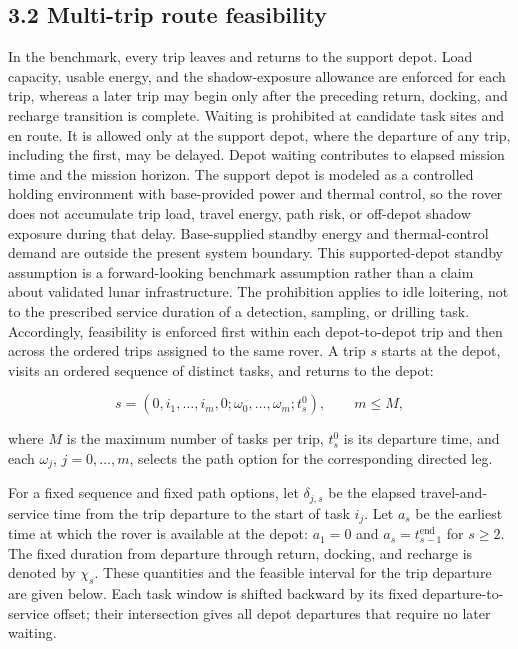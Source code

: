 \documentclass[
  11pt,
]{article}
\begin{document}
\hypertarget{multi-trip-route-feasibility}{%
\subsection{3.2 Multi-trip route
feasibility}\label{multi-trip-route-feasibility}}

In the benchmark, every trip leaves and returns to the support depot.
Load capacity, usable energy, and the shadow-exposure allowance are
enforced for each trip, whereas a later trip may begin only after the
preceding return, docking, and recharge transition is complete. Waiting
is prohibited at candidate task sites and en route. It is allowed only
at the support depot, where the departure of any trip, including the
first, may be delayed. Depot waiting contributes to elapsed mission time
and the mission horizon. The support depot is modeled as a controlled
holding environment with base-provided power and thermal control, so the
rover does not accumulate trip load, travel energy, path risk, or
off-depot shadow exposure during that delay. Base-supplied standby
energy and thermal-control demand are outside the present system
boundary. This supported-depot standby assumption is a forward-looking
benchmark assumption rather than a claim about validated lunar
infrastructure. The prohibition applies to idle loitering, not to the
prescribed service duration of a detection, sampling, or drilling task.
Accordingly, feasibility is enforced first within each depot-to-depot
trip and then across the ordered trips assigned to the same rover. A
trip \(s\) starts at the depot, visits an ordered sequence of distinct
tasks, and returns to the depot:

\[
s=(0,i_1,\ldots,i_m,0; \omega_0,\ldots,\omega_m;t_s^0),
\qquad m\le M,
\tag{2}
\]

where \(M\) is the maximum number of tasks per trip, \(t_s^0\) is its
departure time, and each \(\omega_j\), \(j=0,\ldots,m\), selects the
path option for the corresponding directed leg.

For a fixed sequence and fixed path options, let \(\delta_{j,s}\) be the
elapsed travel-and-service time from the trip departure to the start of
task \(i_j\). Let \(a_s\) be the earliest time at which the rover is
available at the depot: \(a_1=0\) and \(a_s=t_{s-1}^{\mathrm{end}}\) for
\(s\ge2\). The fixed duration from departure through return, docking,
and recharge is denoted by \(\chi_s\). These quantities and the feasible
interval for the trip departure are given below. Each task window is
shifted backward by its fixed departure-to-service offset; their
intersection gives all depot departures that require no later waiting.
\end{document}
